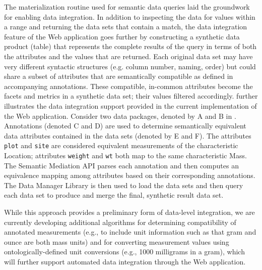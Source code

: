  The materialization routine used for
semantic data queries laid the groundwork for enabling data
integration. In addition to inspecting the data for values within a
range and returning the data sets that contain a match, the data
integration feature of the Web application goes further by
constructing a synthetic data product (table) that represents the
complete results of the query in terms of both the attributes and the
values that are returned. Each original data set may have very
different syntactic structures (e.g. column number, naming, order) but
could share a subset of attributes that are semantically compatible as
defined in accompanying annotations. These compatible, in-common
attributes become the facets and metrics in a synthetic data set; their
values filtered accordingly.  further
illustrates the data integration support provided in the current
implementation of the Web application. Consider two data packages,
denoted by A and B in .  Annotations (denoted
C and D) are used to determine semantically equivalent data attributes
contained in the data sets (denoted by E and F). The attributes {\tt
  plot} and {\tt site} are considered equivalent measurements of the
characteristic Location; attributes {\tt weight} and {\tt wt} both map
to the same characteristic Mass. The Semantic Mediation API parses
each annotation and then computes an equivalence mapping among
attributes based on their corresponding annotations. The Data Manager
Library is then used to load the data sets and then query each data
set to produce and merge the final, synthetic result data set. 

While this approach provides a preliminary form of data-level
integration, we are currently developing additional algorithms for
determining compatibility of annotated measurements (e.g., to include
unit information such as that gram and ounce are both mass units) and
for converting measurement values using ontologically-defined unit
conversions (e.g., 1000 milligrams in a gram), which will further
support automated data integration through the Web application.


